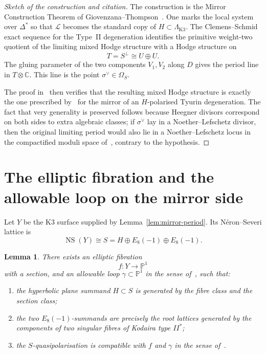\documentclass[11pt]{article}
\newtheorem{lemma}[theorem]{Lemma}
\theoremstyle{remark}
\numberwithin{equation}{section}
\begin{document}
\begin{proof}[Sketch of the construction and citation]
The construction is the Mirror Construction Theorem of Giovenzana--Thompson~\cite[\S5]{dfk3slpms}. One marks the local system over \(\Delta^*\) so that \(\mathcal L\) becomes the standard copy of \(H\subset \Lambda_{\mathrm{K3}}\). The Clemens--Schmid exact sequence for the Type~II degeneration identifies the primitive weight-two quotient of the limiting mixed Hodge structure with a Hodge structure on
\[
T=S^\perp\cong U\oplus U.
\]
The gluing parameter of the two components \(V_1,V_2\) along \(D\) gives the period line in \(T\otimes \mathbb C\). This line is the point \(\sigma^\vee\in \Omega_S\).

The proof in~\cite{dfk3slpms} then verifies that the resulting mixed Hodge structure is exactly the one prescribed by~\cite[Definition~5.1]{dfk3slpms} for the mirror of an \(H\)-polarised Tyurin degeneration. The fact that very generality is preserved follows because Heegner divisors correspond on both sides to extra algebraic classes; if \(\sigma^\vee\) lay in a Noether--Lefschetz divisor, then the original limiting period would also lie in a Noether--Lefschetz locus in the compactified moduli space of~\cite{cmek3sspt}, contrary to the hypothesis.
\end{proof}

\section{The elliptic fibration and the allowable loop on the mirror side}

Let \(Y\) be the K3 surface supplied by Lemma~\ref{lem:mirror-period}. Its Néron--Severi lattice is
\[
\operatorname{NS}(Y)\cong S=H\oplus E_8(-1)\oplus E_8(-1).
\]

\begin{lemma}\label{lem:fibration-loop}
There exists an elliptic fibration
\[
f\colon Y\longrightarrow \mathbb P^1
\]
with a section, and an allowable loop \(\gamma\subset \mathbb P^1\) in the sense of~\cite[Definition~4.11]{dfk3slpms}, such that:
\begin{enumerate}
  \item the hyperbolic plane summand \(H\subset S\) is generated by the fibre class and the section class;
  \item the two \(E_8(-1)\)-summands are precisely the root lattices generated by the components of two singular fibres of Kodaira type \(II^*\);
  \item the \(S\)-quasipolarisation is compatible with \(f\) and \(\gamma\) in the sense of~\cite[Definition~4.21]{dfk3slpms}.
\end{enumerate}
\end{lemma}
\end{document}
